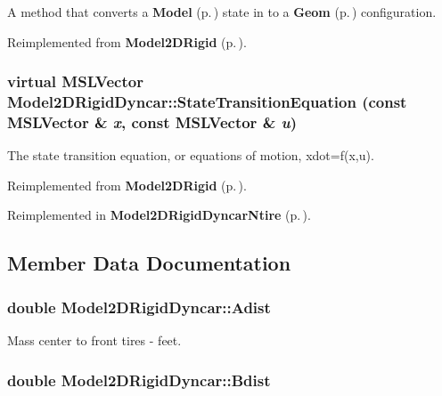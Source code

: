 A method that converts a {\bf Model} {\rm (p.\,\pageref{class_Model})} state in to a {\bf Geom} {\rm (p.\,\pageref{class_Geom})} configuration.



Reimplemented from {\bf Model2DRigid} {\rm (p.\,\pageref{class_Model2DRigid_a6})}.
\subsubsection{\setlength{\rightskip}{0pt plus 5cm}virtual {\bf MSLVector} Model2DRigid\-Dyncar::State\-Transition\-Equation (const {\bf MSLVector} \& {\em x}, const {\bf MSLVector} \& {\em u})\hspace{0.3cm}{\tt  [virtual]}}\label{class_Model2DRigidDyncar_a4}


The state transition equation, or equations of motion, xdot=f(x,u).



Reimplemented from {\bf Model2DRigid} {\rm (p.\,\pageref{class_Model2DRigid_a3})}.

Reimplemented in {\bf Model2DRigid\-Dyncar\-Ntire} {\rm (p.\,\pageref{class_Model2DRigidDyncarNtire_a2})}.

\subsection{Member Data Documentation}
\subsubsection{\setlength{\rightskip}{0pt plus 5cm}double Model2DRigid\-Dyncar::Adist}\label{class_Model2DRigidDyncar_m3}


Mass center to front tires - feet.

\subsubsection{\setlength{\rightskip}{0pt plus 5cm}double Model2DRigid\-Dyncar::Bdist}\label{class_Model2DRigidDyncar_m4}


